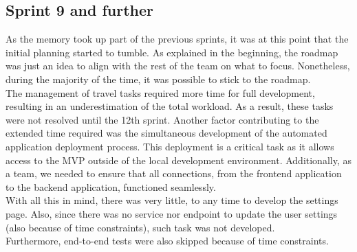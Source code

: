 \documentclass[../memory.tex]{subfiles}
\begin{document}
\subsection{Sprint 9 and further}
As the memory took up part of the previous sprints, it was at this point that
the initial planning started to tumble. As explained in the beginning, the
roadmap was just an idea to align with the rest of the team on what to focus.
Nonetheless, during the majority of the time, it was possible to stick to the
roadmap.
\\
The management of travel tasks required more time for full development,
resulting in an underestimation of the total workload. As a result, these tasks
were not resolved until the 12th sprint. Another factor contributing to the
extended time required was the simultaneous development of the automated
application deployment process. This deployment is a critical task as it allows
access to the MVP outside of the local development environment. Additionally, as
a team, we needed to ensure that all connections, from the frontend application
to the backend application, functioned seamlessly.
\\[8pt]
With all this in mind, there was very little, to any time to develop the
settings page. Also, since there was no service nor endpoint to update the user
settings (also because of time constraints), such task was not developed.
\\
Furthermore, end-to-end tests were also skipped because of time constraints.
\end{document}

